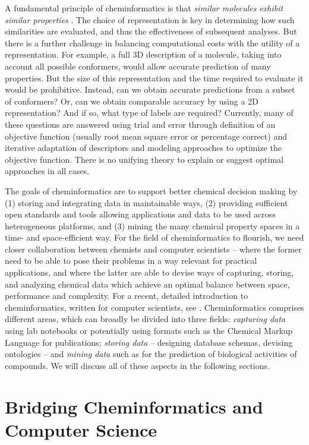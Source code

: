 \documentclass{../sig-alternate}
\begin{document}
A fundamental principle of cheminformatics is that \emph{similar
molecules exhibit similar properties} \cite{Johnson:1990qf}. The
choice of representation is key in determining how such similarities
are evaluated, and thus the effectiveness of subsequent analyses. But
there is a further challenge in balancing computational costs with 
the utility of a
representation. For example, a full 3D description of a molecule,
taking into account all possible conformers, would allow accurate
prediction of many properties. But the size of this representation and the
time required to evaluate it would be prohibitive. Instead, can we
obtain accurate predictions from a subset of conformers? Or, can we
obtain comparable accuracy by using a 2D representation? And if so,
what type of labels are required? Currently, many of these questions
are answered using trial and error through definition of an objective function
(usually root mean square error or percentage correct) and
iterative adaptation of descriptors and modeling approaches to
optimize the objective function. There is no
unifying theory to explain or suggest optimal approaches in all cases.

The goals of cheminformatics are to support better chemical
decision making by (1) storing and integrating data in maintainable
ways, (2) providing sufficient open standards and tools allowing
applications and data to be used across heterogeneous platforms, and
(3) mining the many chemical property spaces in a time- and
space-efficient way. For the field of cheminformatics 
to flourish, we need closer
collaboration between chemists 
and computer scientists -- where the former need to be able to pose
their problems in a way relevant for practical applications, and where
the latter are able to devise ways of capturing, storing, and
analyzing chemical data which achieve an optimal balance between space,
performance and complexity. For a recent,
detailed introduction to cheminformatics, written for computer
scientists, see \cite{brown2009}.
Cheminformatics comprises different areas, which can broadly
be divided into three fields: \emph{capturing data} using lab
notebooks or potentially using formats such as the Chemical Markup
Language for publications; \emph{storing data} -- designing database
schemas, devising ontologies -- and \emph{mining data} such as for the
prediction of biological activities of compounds.  
We will discuss all of these aspects in the following
sections.

\section{Bridging Cheminformatics and Computer Science}
\end{document}
